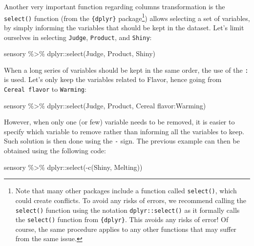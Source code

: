 \documentclass[
]{book}
\newenvironment{Shaded}{\begin{snugshade}}{\end{snugshade}}
\newcommand{\AttributeTok}[1]{\textcolor[rgb]{0.77,0.63,0.00}{#1}}
\newcommand{\FunctionTok}[1]{\textcolor[rgb]{0.00,0.00,0.00}{#1}}
\newcommand{\NormalTok}[1]{#1}
\newcommand{\SpecialCharTok}[1]{\textcolor[rgb]{0.00,0.00,0.00}{#1}}
\newcommand{\StringTok}[1]{\textcolor[rgb]{0.31,0.60,0.02}{#1}}
\begin{document}
Another very important function regarding columns transformation is the \texttt{select()} function (from the \texttt{\{dplyr\}} package\footnote{Note that many other packages include a function called \texttt{select()}, which could create conflicts. To avoid any risks of errors, we recommend calling the \texttt{select()} function using the notation \texttt{dplyr::select()} as it formally calls the \texttt{select()} function from \texttt{\{dplyr\}}. This avoids any risks of error! Of course, the same procedure applies to any other functions that may suffer from the same issue.}) allows selecting a set of variables, by simply informing the variables that should be kept in the dataset. Let's limit ourselves in selecting \texttt{Judge}, \texttt{Product}, and \texttt{Shiny}:

\begin{Shaded}
\begin{Highlighting}[]
\NormalTok{sensory }\SpecialCharTok{\%\textgreater{}\%} 
\NormalTok{  dplyr}\SpecialCharTok{::}\FunctionTok{select}\NormalTok{(Judge, Product, Shiny)}
\end{Highlighting}
\end{Shaded}

When a long series of variables should be kept in the same order, the use of the \texttt{:} is used.
Let's only keep the variables related to Flavor, hence going from \texttt{Cereal\ flavor} to \texttt{Warming}:

\begin{Shaded}
\begin{Highlighting}[]
\NormalTok{sensory }\SpecialCharTok{\%\textgreater{}\%} 
\NormalTok{  dplyr}\SpecialCharTok{::}\FunctionTok{select}\NormalTok{(Judge, Product, }\StringTok{\textasciigrave{}}\AttributeTok{Cereal flavor}\StringTok{\textasciigrave{}}\SpecialCharTok{:}\NormalTok{Warming)}
\end{Highlighting}
\end{Shaded}

However, when only one (or few) variable needs to be removed, it is easier to specify which variable to remove rather than informing all the variables to keep. Such solution is then done using the \texttt{-} sign. The previous example can then be obtained using the following code:

\begin{Shaded}
\begin{Highlighting}[]
\NormalTok{sensory }\SpecialCharTok{\%\textgreater{}\%} 
\NormalTok{  dplyr}\SpecialCharTok{::}\FunctionTok{select}\NormalTok{(}\SpecialCharTok{{-}}\FunctionTok{c}\NormalTok{(Shiny, Melting))}
\end{Highlighting}
\end{Shaded}
\end{document}
